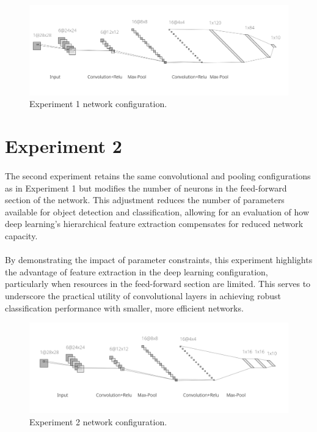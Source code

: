 \begin{figure}[H]
	\centering
	\includegraphics[width=\linewidth]{screenshot003}
	\caption{Experiment 1 network configuration.}
	\label{fig:screenshot003}
\end{figure}


\section{Experiment 2}
\paragraph{}
The second experiment retains the same convolutional and pooling configurations as in Experiment 1 but modifies the number of neurons in the feed-forward section of the network. This adjustment reduces the number of parameters available for object detection and classification, allowing for an evaluation of how deep learning's hierarchical feature extraction compensates for reduced network capacity.

\paragraph{}
By demonstrating the impact of parameter constraints, this experiment highlights the advantage of feature extraction in the deep learning configuration, particularly when resources in the feed-forward section are limited. This serves to underscore the practical utility of convolutional layers in achieving robust classification performance with smaller, more efficient networks.

\begin{figure}[H]
	\centering
	\includegraphics[width=\linewidth]{screenshot004}
	\caption{Experiment 2 network configuration.}
	\label{fig:screenshot004}
\end{figure}
